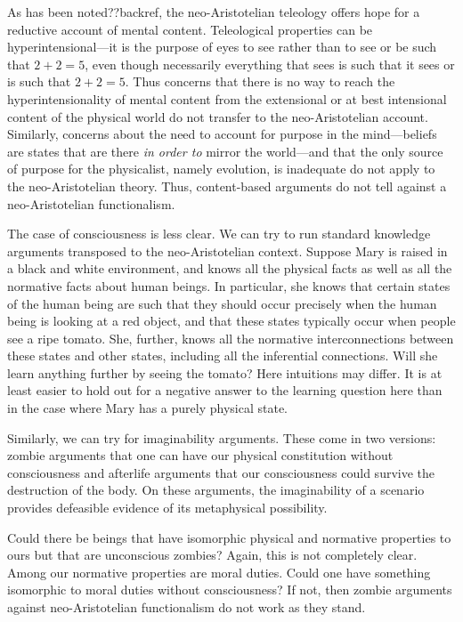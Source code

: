 As has been noted??backref, the neo-Aristotelian teleology offers hope for a reductive account of mental content. Teleological properties
can be hyperintensional---it is the purpose of eyes to see rather than to see or be such that $2+2=5$, even though necessarily
everything that sees is such that it sees or is such that $2+2=5$. Thus concerns that there is no way to reach the hyperintensionality
of mental content from the extensional or at best intensional content of the physical world do not transfer to the neo-Aristotelian
account. Similarly, concerns about the need to account for purpose in the mind---beliefs are states that are there 
\textit{in order to} mirror the world---and that the only source of purpose for the physicalist, namely evolution, is inadequate
do not apply to the neo-Aristotelian theory. Thus, content-based arguments do not tell against a neo-Aristotelian functionalism.

The case of consciousness is less clear. We can try to run standard knowledge arguments transposed to the neo-Aristotelian context.
Suppose Mary is raised in a black and white environment, and knows all the physical facts as well as all the normative facts about
human beings. In particular, she knows that certain states of the human being are such that they should occur precisely when the
human being is looking at a red object, and that these states typically occur when people see a ripe tomato. She, further, knows all
the normative interconnections between these states and other states, including all the inferential connections. Will she learn anything
further by seeing the tomato? Here intuitions may differ. It is at least easier to hold out for a negative answer to the learning question
here than in the case where Mary has a purely physical state.

Similarly, we can try for imaginability arguments. These come in two versions: zombie arguments that one can have our physical
constitution without consciousness and afterlife arguments that our consciousness could survive the destruction of the body.
On these arguments, the imaginability of a scenario provides defeasible evidence of its metaphysical possibility. 

Could there be beings that have isomorphic physical and normative properties to ours
but that are unconscious zombies? Again, this is not completely clear. Among our normative properties are moral duties. Could one
have something isomorphic to moral duties without consciousness? If not, then zombie arguments against neo-Aristotelian functionalism 
do not work as they stand. 

